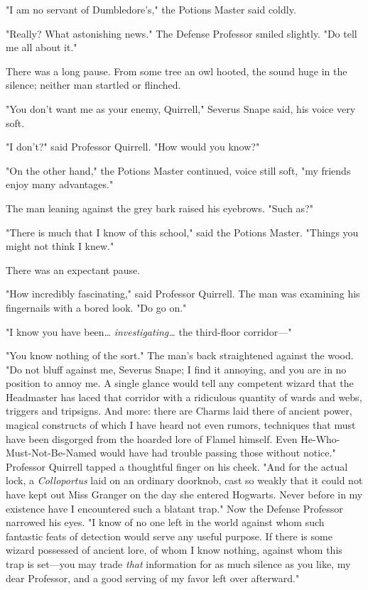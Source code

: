"I am no servant of Dumbledore's," the Potions Master said coldly.

"Really? What astonishing news." The Defense Professor smiled slightly. "Do 
tell me all about it."

There was a long pause. From some tree an owl hooted, the sound huge in the 
silence; neither man startled or flinched.

"You don't want me as your enemy, Quirrell," Severus Snape said, his voice very 
soft.

"I don't?" said Professor Quirrell. "How would you know?"

"On the other hand," the Potions Master continued, voice still soft, "my 
friends enjoy many advantages."

The man leaning against the grey bark raised his eyebrows. "Such as?"

"There is much that I know of this school," said the Potions Master. "Things 
you might not think I knew."

There was an expectant pause.

"How incredibly fascinating," said Professor Quirrell. The man was examining 
his fingernails with a bored look. "Do go on."

"I know you have been{\ldots} \emph{investigating{\ldots}} the third-floor 
corridor---"

"You know nothing of the sort." The man's back straightened against the wood. 
"Do not bluff against me, Severus Snape; I find it annoying, and you are in no 
position to annoy me. A single glance would tell any competent wizard that the 
Headmaster has laced that corridor with a ridiculous quantity of wards and 
webs, triggers and tripsigns. And more: there are Charms laid there of ancient 
power, magical constructs of which I have heard not even rumors, techniques 
that must have been disgorged from the hoarded lore of Flamel himself. Even 
He-Who-Must-Not-Be-Named would have had trouble passing those without notice." 
Professor Quirrell tapped a thoughtful finger on his cheek. "And for the actual 
lock, a \emph{Colloportus} laid on an ordinary doorknob, cast so weakly that it 
could not have kept out Miss Granger on the day she entered Hogwarts. Never 
before in my existence have I encountered such a blatant trap." Now the Defense 
Professor narrowed his eyes. "I know of no one left in the world against whom 
such fantastic feats of detection would serve any useful purpose. If there is 
some wizard possessed of ancient lore, of whom I know nothing, against whom 
this trap is set---you may trade \emph{that} information for as much silence as 
you like, my dear Professor, and a good serving of my favor left over 
afterward."

